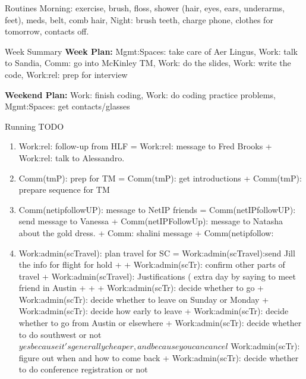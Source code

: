 \begin{frame}
\begin{columns}
\begin{column}{0.50\linewidth}
      \begin{block}{Routines}
        Morning: exercise, brush, floss, shower (hair, eyes, ears,
        underarms, feet), meds,  belt, comb hair, Night: brush teeth, charge
        phone, clothes for tomorrow, contacts off.  
      \end{block}
      
      \begin{block}{Week Summary}
        {\tiny \textbf{Week Plan:} Mgmt:Spaces: take care of Aer 
          Lingus, Work: talk to Sandia,
          Comm: go into McKinley TM, Work: do the slides, Work: write
          the code, Work:rel: prep for interview} 
        

        {\tiny \textbf{Weekend Plan:} Work: finish coding, Work: do
          coding practice problems, Mgmt:Spaces: get contacts/glasses }
      \end{block}

      \begin{block}{Running TODO} %
        \begin{enumerate}
        \item \small Work:rel: follow-up from HLF = Work:rel: message to
          Fred Brooks + Work:rel: talk to Alessandro. 

        \item \tiny Comm(tmP): prep for TM   = Comm(tmP): get
          introductions  + Comm(tmP): prepare sequence
          for TM 

        \item \tiny Comm(netipfollowUP): message to NetIP friends  = 
          Comm(netIPfollowUP): send message to Vanessa  + Comm(netIPFollowUp): message to Natasha about
          the gold dress. + Comm: shalini message + Comm(netipfollow: 
             

        \item \tiny Work:admin(scTravel): plan travel for SC =
          Work:admin(scTravel):send Jill the info for flight for hold
           +  + Work:admin(scTr): confirm other parts of
          travel + Work:admin(scTravel): Justifications ( extra day by saying
          to meet friend in Austin +
           +
           +  Work:admin(scTr): decide whether to go + 
          Work:admin(scTr): decide whether to leave on Sunday or
          Monday +
          Work:admin(scTr): decide how early to leave + 
         Work:admin(scTr): decide whether to go from Austin or
          elsewhere 
          + Work:admin(scTr): decide whether to do southwest or not
          $yes because it's generally cheaper, and because you can
          cancel$ 
          Work:admin(scTr): figure out when and how to come back + 
          Work:admin(scTr): decide whether to do conference
          registration or not 


\end{enumerate}
\end{block}
\end{column}
\end{columns}
\end{frame}
